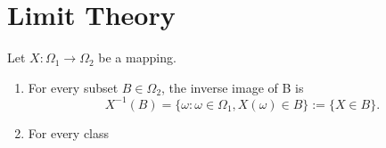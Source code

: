 \chapter{Limit Theory}

\begin{definition}[Mapping]
    Let $X:\Omega_1\rightarrow\Omega_2$ be a mapping.
    \begin{enumerate}
        \item
              For every subset $B\in\Omega_2$, the inverse image of B is
              \begin{equation*}
                  X^{-1}(B)=\{\omega:\omega\in\Omega_1,X(\omega)\in B\}:=\{X\in B\}.
              \end{equation*}
        \item
              For every class
    \end{enumerate}
\end{definition}
